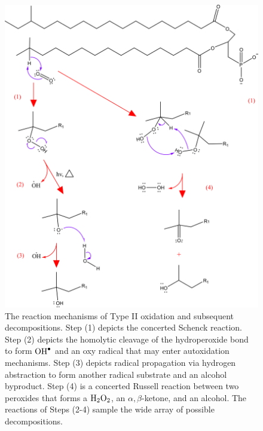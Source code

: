 \begin{figure}[t]
    \centering
    \includegraphics[width = \textwidth]{images/PDIpy/background/BCFA_schenck_oxidation_2.png}
    \caption{
         The reaction mechanisms of Type II oxidation and subsequent decompositions. Step (1) depicts the concerted \cite{Foote1968PhotosensitizedOxygen} Schenck reaction. Step (2) depicts the homolytic cleavage of the hydroperoxide bond to form $\ce{OH^.}$ and an oxy radical that may enter autoxidation mechanisms. Step (3) depicts radical propagation via hydrogen abstraction to form another radical substrate and an alcohol byproduct. Step (4) is a concerted Russell reaction \cite{Russell1957Deuterium-isotopeRadicals,Howard1968TheMechanism} between two peroxides that forms a $\ce{H2O2}$, an $\alpha,\beta$-ketone, and an alcohol. The reactions of Steps (2-4) sample the wide array of possible decompositions.
    }
    \label{schenck_mechanism}
\end{figure}

